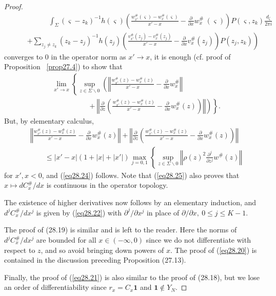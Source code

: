\documentclass{surv-l}
\theoremstyle{plain}
\theoremstyle{definition}
\numberwithin{equation}{chapter}
\begin{document}
\begin{proof}
\begin{align}
&\qquad\qquad\quad\int_{\Sigma}(\varsigma-z_{k})^{-1}h(\varsigma)\left(\frac{w_{x'}^{\#}(\varsigma)-w_{x}^{\#}(\varsigma)}{x'-x}-\frac{\partial}{\partial x}w_{x}^{\#}\ (\varsigma)\right)P(\varsigma, z_{k})\frac{d_{\zeta}}{2\pi i}\\ \nonumber
&\quad\quad\left.+\sum_{z_{j}\neq z_{k}}(z_{k}-z_{j})^{-1}h(z_{j})\left(\frac{v_{x'}^{\#}(z_
{j})-v_{x}^{\#}(z_{j})}{x'-x}-\frac{\partial}{\partial x}v_{x}^{\#}(z_{j})\right)P(z_{j},z_{k}) \right)\nonumber
\end{align}
converges to $0$ in the operator norm as $x'\rightarrow x$, it is enough (cf. proof of Proposition ~\ref{prop27.4}) to show that
\begin{align}\label{eq28.25}
&\lim_{x'\rightarrow x}\left\{\sup_{z\in\Sigma\backslash 0}\left(\left\Vert\frac{w_{x'}^{\#}(z)-w_{x}^{\#}(z)}{x'-x}-\frac{\partial}{\partial x}w_{x}^{\#}\right\Vert\right.\right.\\
&\qquad\qquad\quad+\left.\left.\left\Vert\frac{\partial}{\partial z}\left(\frac{w_{x'}^{\#}(z)-w_{x}^{\#}(z)}{x'-x}-\frac{\partial}{\partial x}w_{x}^{\#}(z)\right)\right\Vert\right)\right\}. \nonumber
\end{align}
But, by elementary calculus,
\begin{align*}
&\left\Vert\frac{w_{x'}^{\#}(z)-w_{x}^{\#}(z)}{x'-x}-\frac{\partial}{\partial x}w_{x}^{\#}(z)\right\Vert+\left\Vert\frac{\partial}{\partial z}\left(\frac{w_{x'}^{\#}(z)-w_{x}^{\#}(z)}{x'-x}-\frac{\partial}{\partial x}w_{x}^{\#}(z)\right)\right\Vert\\
&\qquad\leq|x'-x|(1+|x|+|x'|)\max_{j=0,1}\left\{\sup_{z\in\Sigma\backslash 0}\left\Vert \rho(z)^{2}\frac{\partial^{j}}{\partial z^{j}}w^{\#}(z)\right\Vert\right.
\end{align*}
for $x',x<0$, and (\ref{eq28.24}) follows. Note that (\ref{eq28.25}) also proves that $x\mapsto dC_{x}^{\#}/dx$ is continuous in the operator topology.

The existence of higher derivatives now follows by an elementary induction, and $d^{j}C_{x}^{\#}/dx^{j}$ is given by (\ref{eq28.22}) with $\partial^{j}/\partial x^{j}$ in place of $\partial/\partial x,\ 0\leq j\leq K-1$.


The proof of (28.19) is similar and is left to the reader. Here the norms of $d^{j}C_{x}^{\#}/dx^{j}$ are bounded for all $x\in(-\infty,0)$ since we do not differentiate with respect to $z$, and so avoid bringing down powers of $x$. The proof of (\ref{eq28.20}) is contained in the discussion preceding Proposition (27.13).

Finally, the proof of (\ref{eq28.21}) is also similar to the proof of (28.18), but we lose an order of differentiability since $r_{x}=C_{x}\mathbf{1}$ and $\mathbf{1}\not\in Y_{N}$.
\end{proof}
\end{document}
